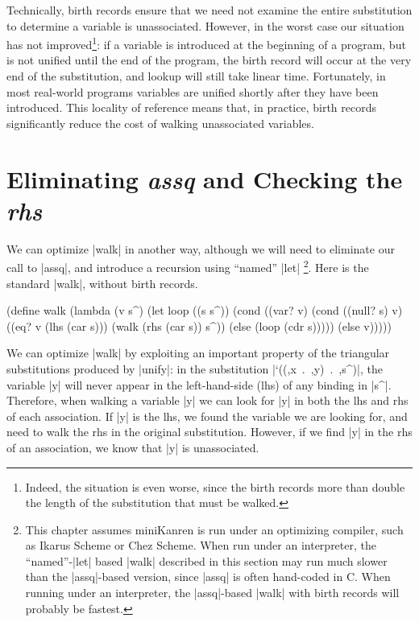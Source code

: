 Technically, birth records ensure that we need not examine the entire
substitution to determine a variable is unassociated.  However, in the
worst case our situation has not improved\footnote{Indeed, the
  situation is even worse, since the birth records more than double
  the length of the substitution that must be walked.}: if a variable
is introduced at the beginning of a program, but is not unified until
the end of the program, the birth record will occur at the very end of
the substitution, and lookup will still take linear time.
Fortunately, in most real-world programs variables are unified shortly
after they have been introduced.  This locality of reference means
that, in practice, birth records significantly reduce the cost of
walking unassociated variables.

\section{Eliminating {\em assq} and Checking the {\em rhs}}\label{elimassq}

We can optimize \mbox{\scheme|walk|} in another way, although we will
need to eliminate our call to \mbox{\scheme|assq|}, and introduce a
recursion using ``named'' \scheme|let|
\footnote{This chapter assumes miniKanren is
  run under an optimizing compiler, such as Ikarus Scheme
  or Chez Scheme.  When run under an interpreter, the
  ``named''-\mbox{\scheme|let|} based \mbox{\scheme|walk|} described in this
  section may run much slower than the \mbox{\scheme|assq|}-based
  version, since \mbox{\scheme|assq|} is often hand-coded in C.  When
  running under an interpreter, the \mbox{\scheme|assq|}-based
  \mbox{\scheme|walk|} with birth records will probably be fastest.}.
Here is the standard \mbox{\scheme|walk|}, without birth records.

\schemedisplayspace
\begin{schemedisplay}
(define walk
  (lambda (v s^)
    (let loop ((s s^))
      (cond
        ((var? v)
         (cond
           ((null? s) v)
           ((eq? v (lhs (car s))) (walk (rhs (car s)) s^))
           (else (loop (cdr s)))))
        (else v)))))
\end{schemedisplay}

We can optimize \mbox{\scheme|walk|} by exploiting an important
property of the triangular substitutions produced by
\mbox{\scheme|unify|}: in the substitution \mbox{\scheme|`((,x . ,y) . ,s^)|},
the variable \mbox{\scheme|y|} will never appear in the
left-hand-side (lhs) of any binding in \mbox{\scheme|s^|}.  Therefore,
when walking a variable \mbox{\scheme|y|} we can look for
\mbox{\scheme|y|} in both the lhs and rhs of each association.  If
\mbox{\scheme|y|} is the lhs, we found the variable we are looking
for, and need to walk the rhs in the original substitution.  However,
if we find \mbox{\scheme|y|} in the rhs of an association, we know
that \mbox{\scheme|y|} is unassociated.

